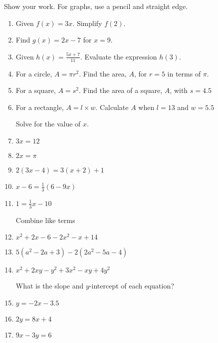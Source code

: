 \documentclass[12pt, oneside]{article}
\begin{document}
Show your work. For graphs, use a pencil and straight edge.
  \begin{enumerate}
\subsubsection*{Factoring Fridays}

  \item Given $f(x)=3x$. Simplify $f(2)$. \vspace{2cm}
  \item Find $g(x)=2x-7$ for $x=9$. \vspace{2.5cm}
  \item Given $\displaystyle h(x)=\frac{5x+7}{11}$. Evaluate the expression $h(3)$. \vspace{5cm}

  \item For a circle, $A=\pi r^2$. Find the area, $A$, for $r=5$ in terms of $\pi$. \vspace{2.5cm}
  \item For a square, $A=s^2$. Find the area of a square, $A$, with $s=4.5$ \vspace{2.5cm}
  \item For a rectangle, $A=l \times w$. Calculate $A$ when $l=13$ and $w=5.5$

  \newpage
Solve for the value of $x$.
  \item   $3x=12$ \vspace{2cm}
  \item   $2x=\pi$ \vspace{2cm}

  \item   $2(3x-4)=3(x+2)+1$ \vspace{4.5cm}
  \item   $x-6=\frac{1}{3}(6-9x)$ \vspace{4.5cm}
  \item   $1=\frac{1}{3}x-10$ \vspace{3cm}

  \newpage
Combine like terms
  \item $x^2+2x -6 -2x^2-x+14$ \vspace{3cm}
  \item $5(a^2-2a +3) -2(2a^2-5a-4)$ \vspace{4cm}
  \item $x^2+2xy -y^2 +3x^2-xy+4y^2$ \vspace{3cm}

What is the slope and $y$-intercept of each equation?
  \item   $y=-2x-3.5$ \vspace{2cm}
  \item   $2y=8x+4$ \vspace{2cm}
  \item   $9x-3y=6$ \vspace{3cm}


\end{enumerate}
\end{document}

